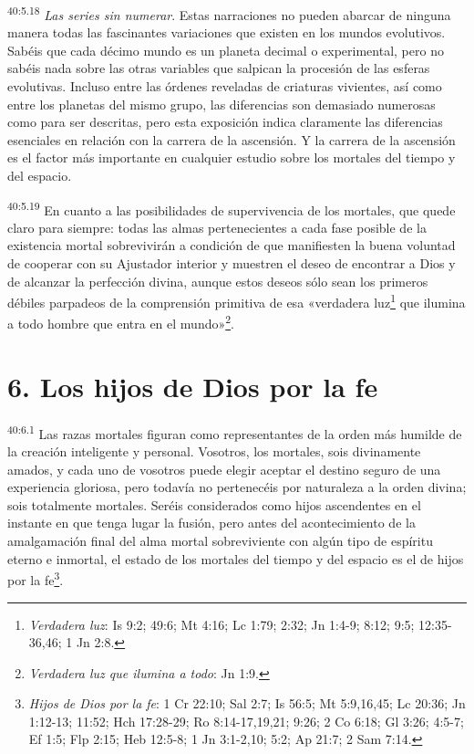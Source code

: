 \par
\textsuperscript{40:5.18} \textit{Las series sin numerar}. Estas narraciones no pueden abarcar de ninguna manera todas las fascinantes variaciones que existen en los mundos evolutivos. Sabéis que cada décimo mundo es un planeta decimal o experimental, pero no sabéis nada sobre las otras variables que salpican la procesión de las esferas evolutivas. Incluso entre las órdenes reveladas de criaturas vivientes, así como entre los planetas del mismo grupo, las diferencias son demasiado numerosas como para ser descritas, pero esta exposición indica claramente las diferencias esenciales en relación con la carrera de la ascensión. Y la carrera de la ascensión es el factor más importante en cualquier estudio sobre los mortales del tiempo y del espacio.

\par
\textsuperscript{40:5.19} En cuanto a las posibilidades de supervivencia de los mortales, que quede claro para siempre: todas las almas pertenecientes a cada fase posible de la existencia mortal sobrevivirán a condición de que manifiesten la buena voluntad de cooperar con su Ajustador interior y muestren el deseo de encontrar a Dios y de alcanzar la perfección divina, aunque estos deseos sólo sean los primeros débiles parpadeos de la comprensión primitiva de esa «verdadera luz\footnote{\textit{Verdadera luz}: Is 9:2; 49:6; Mt 4:16; Lc 1:79; 2:32; Jn 1:4-9; 8:12; 9:5; 12:35-36,46; 1 Jn 2:8.} que ilumina a todo hombre que entra en el mundo»\footnote{\textit{Verdadera luz que ilumina a todo}: Jn 1:9.}.

\section*{6. Los hijos de Dios por la fe}
\par
\textsuperscript{40:6.1} Las razas mortales figuran como representantes de la orden más humilde de la creación inteligente y personal. Vosotros, los mortales, sois divinamente amados, y cada uno de vosotros puede elegir aceptar el destino seguro de una experiencia gloriosa, pero todavía no pertenecéis por naturaleza a la orden divina; sois totalmente mortales. Seréis considerados como hijos ascendentes en el instante en que tenga lugar la fusión, pero antes del acontecimiento de la amalgamación final del alma mortal sobreviviente con algún tipo de espíritu eterno e inmortal, el estado de los mortales del tiempo y del espacio es el de hijos por la fe\footnote{\textit{Hijos de Dios por la fe}: 1 Cr 22:10; Sal 2:7; Is 56:5; Mt 5:9,16,45; Lc 20:36; Jn 1:12-13; 11:52; Hch 17:28-29; Ro 8:14-17,19,21; 9:26; 2 Co 6:18; Gl 3:26; 4:5-7; Ef 1:5; Flp 2:15; Heb 12:5-8; 1 Jn 3:1-2,10; 5:2; Ap 21:7; 2 Sam 7:14.}.

